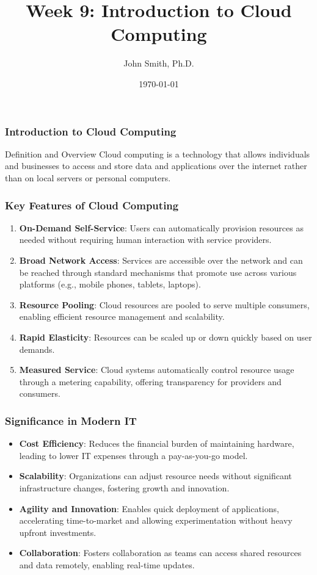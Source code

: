\documentclass[aspectratio=169]{beamer}
\title[Week 9: Introduction to Cloud Computing]{Week 9: Introduction to Cloud Computing}
\author[J. Smith]{John Smith, Ph.D.}
\date{\today}
\begin{document}
\frame{\titlepage}

\begin{frame}[fragile]
    \frametitle{Introduction to Cloud Computing}
    \begin{block}{Definition and Overview}
        Cloud computing is a technology that allows individuals and businesses to access and store data and applications over the internet rather than on local servers or personal computers.
    \end{block}
\end{frame}

\begin{frame}[fragile]
    \frametitle{Key Features of Cloud Computing}
    \begin{enumerate}
        \item \textbf{On-Demand Self-Service}: Users can automatically provision resources as needed without requiring human interaction with service providers.
        
        \item \textbf{Broad Network Access}: Services are accessible over the network and can be reached through standard mechanisms that promote use across various platforms (e.g., mobile phones, tablets, laptops).
        
        \item \textbf{Resource Pooling}: Cloud resources are pooled to serve multiple consumers, enabling efficient resource management and scalability.
        
        \item \textbf{Rapid Elasticity}: Resources can be scaled up or down quickly based on user demands.
        
        \item \textbf{Measured Service}: Cloud systems automatically control resource usage through a metering capability, offering transparency for providers and consumers.
    \end{enumerate}
\end{frame}

\begin{frame}[fragile]
    \frametitle{Significance in Modern IT}
    \begin{itemize}
        \item \textbf{Cost Efficiency}: Reduces the financial burden of maintaining hardware, leading to lower IT expenses through a pay-as-you-go model.
        
        \item \textbf{Scalability}: Organizations can adjust resource needs without significant infrastructure changes, fostering growth and innovation.
        
        \item \textbf{Agility and Innovation}: Enables quick deployment of applications, accelerating time-to-market and allowing experimentation without heavy upfront investments.
        
        \item \textbf{Collaboration}: Fosters collaboration as teams can access shared resources and data remotely, enabling real-time updates.
    \end{itemize}
\end{frame}
\end{document}
